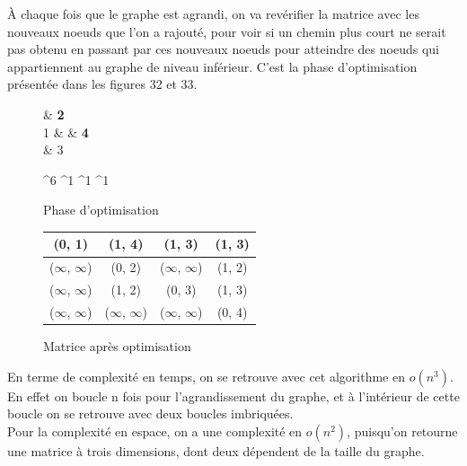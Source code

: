 \documentclass[a4paper,12pt,final] {article}
\begin{document}
À chaque fois que le graphe est agrandi, on va revérifier la matrice avec les nouveaux noeuds que l'on a rajouté, pour voir si un chemin plus court ne serait pas obtenu en passant par ces nouveaux noeuds pour atteindre des noeuds qui appartiennent au graphe de niveau inférieur. C'est la phase d'optimisation présentée dans les figures 32 et 33.\\

\begin{figure}[h!]
 \centering
 \begin{psmatrix}[mnode=circle]
	    & {\color{red} \bf 2}\\
	 1 &    & {\color{red} \bf 4}\\
	    & 3\\
\end{psmatrix}
	
	^{6}
	^{1}
	^{1}
	^{1}

  \caption{Phase d'optimisation}
\end{figure}

\begin{figure}[h!]
\begin{center}
\begin{tabular}{|c|c|c|c|}
\hline
(0, 1) & {\color{red} \bf (1, 4)} & (1, 3) & {\color{red} \bf (1, 3)} \\
\hline
($\infty$, $\infty$) & (0, 2) & ($\infty$, $\infty$) & (1, 2) \\
\hline
($\infty$, $\infty$) & (1, 2) & (0, 3) & (1, 3)\\
\hline
($\infty$, $\infty$) & ($\infty$, $\infty$) & ($\infty$, $\infty$) & (0, 4) \\
\hline
\end{tabular}
\end{center}
\caption{Matrice après optimisation}
\end{figure}

En terme de complexité en temps, on se retrouve avec cet algorithme en $o(n^{3})$. En effet on boucle n fois pour l'agrandissement du graphe, et à l'intérieur de cette boucle on se retrouve avec deux boucles imbriquées.\\

Pour la complexité en espace, on a une complexité en $o(n^{2})$, puisqu'on retourne une matrice à trois dimensions, dont deux dépendent de la taille du graphe.\\
\end{document}
